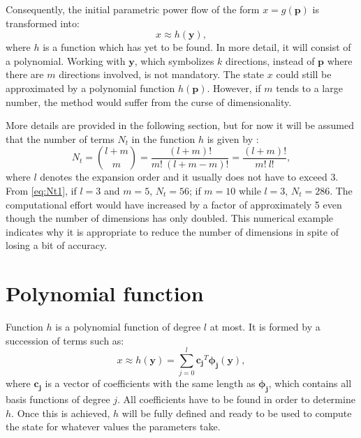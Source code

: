 Consequently, the initial parametric power flow of the form $x=g(\mathbf{p})$ is transformed into:
\begin{equation}
  x \approx h(\mathbf{y}),
  \label{eq:y2}
\end{equation}
where $h$ is a function which has yet to be found. In more detail, it will consist of a polynomial. Working with $\mathbf{y}$, which symbolizes $k$ directions, instead of $\mathbf{p}$ where there are $m$ directions involved, is not mandatory. The state $x$ could still be approximated by a polynomial function $h(\mathbf{p})$. However, if $m$ tends to a large number, the method would suffer from the curse of dimensionality. 

More details are provided in the following section, but for now it will be assumed that the number of terms $N_t$ in the function $h$ is given by \cite{shen2020, zhou2016}:
\begin{equation}
  N_{t} = \binom{l+m}{m} = \frac{(l + m)!}{m! \ (l + m - m)!} = \frac{(l + m)!}{m! \ l!}  ,
  \label{eq:Nt1}
\end{equation}
where $l$ denotes the expansion order and it usually does not have to exceed 3. From \eqref{eq:Nt1}, if $l=3$ and $m=5$, $N_t = 56$; if $m=10$ while $l=3$, $N_t = 286$. The computational effort would have increased by a factor of approximately 5 even though the number of dimensions has only doubled. This numerical example indicates why it is appropriate to reduce the number of dimensions in spite of losing a bit of accuracy. 




\section{Polynomial function}
Function $h$ is a polynomial function of degree $l$ at most. It is formed by a succession of terms such as:
\begin{equation}
  x \approx h(\mathbf{y}) = \sum_{j=0}^l \mathbf{c_j}^T \mathbf{\phi_j}(\mathbf{y}),
  \label{eq:poly1}
\end{equation}
where $\mathbf{c_j}$ is a vector of coefficients with the same length as $\mathbf{\phi_j}$, which contains all basis functions of degree $j$. All coefficients have to be found in order to determine $h$. Once this is achieved, $h$ will be fully defined and ready to be used to compute the state for whatever values the parameters take. 

